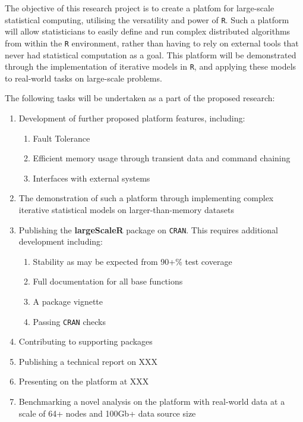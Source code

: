 The objective of this research project is to create a platfom for large-scale statistical computing, utilising the versatility and power of \texttt{R}.
Such a platform will allow statisticians to easily define and run complex distributed algorithms from within the \texttt{R} environment, rather than having to rely on external tools that never had statistical computation as a goal.
This platform will be demonstrated through the implementation of iterative models in \texttt{R}, and applying these models to real-world tasks on large-scale problems.

The following tasks will be undertaken as a part of the proposed research:

\begin{enumerate}
        \item Development of further proposed platform features, including:
                \begin{enumerate}
                        \item Fault Tolerance
                        \item Efficient memory usage through transient data and command chaining
                        \item Interfaces with external systems
                \end{enumerate}
        \item The demonstration of such a platform through implementing complex iterative statistical models on larger-than-memory datasets
	\item Publishing the \textbf{largeScaleR} package on \texttt{CRAN}. This requires additional development including:
                \begin{enumerate}
                        \item Stability as may be expected from 90+\% test coverage
                        \item Full documentation for all base functions
                        \item A package vignette
			\item Passing \texttt{CRAN} checks
                \end{enumerate}
        \item Contributing to supporting packages
        \item Publishing a technical report on XXX
        \item Presenting on the platform at XXX
        \item Benchmarking a novel analysis on the platform with real-world data at a scale of 64+ nodes and 100Gb+ data source size
\end{enumerate}
